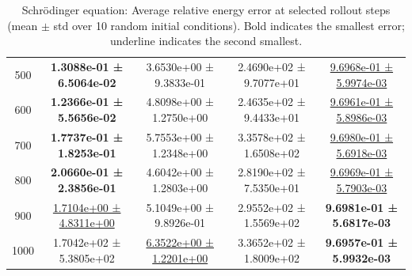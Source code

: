 \documentclass{article}
\theoremstyle{plain}
\theoremstyle{definition}
\theoremstyle{remark}
\begin{document}
\begin{table}[htbp]
\begin{tabular}{ccccc}
500 & \textbf{1.3088e-01 ± 6.5064e-02} & 3.6530e+00 ± 9.3833e-01 & 2.4690e+02 ± 9.7077e+01 & \underline{9.6968e-01 ± 5.9974e-03} \\
600 & \textbf{1.2366e-01 ± 5.5656e-02} & 4.8098e+00 ± 1.2750e+00 & 2.4635e+02 ± 9.4433e+01 & \underline{9.6961e-01 ± 5.8986e-03} \\
700 & \textbf{1.7737e-01 ± 1.8253e-01} & 5.7553e+00 ± 1.2348e+00 & 3.3578e+02 ± 1.6508e+02 & \underline{9.6980e-01 ± 5.6918e-03} \\
800 & \textbf{2.0660e-01 ± 2.3856e-01} & 4.6042e+00 ± 1.2803e+00 & 2.8190e+02 ± 7.5350e+01 & \underline{9.6969e-01 ± 5.7903e-03} \\
900 & \underline{1.7104e+00 ± 4.8311e+00} & 5.1049e+00 ± 9.8926e-01 & 2.9552e+02 ± 1.5569e+02 & \textbf{9.6981e-01 ± 5.6817e-03} \\
1000& 1.7042e+02 ± 5.3805e+02 & \underline{6.3522e+00 ± 1.2201e+00} & 3.3652e+02 ± 1.8009e+02 & \textbf{9.6957e-01 ± 5.9932e-03} \\
\hline
\end{tabular}
\caption{Schr\"odinger equation: Average relative energy error at selected rollout steps
(mean $\pm$ std over 10 random initial conditions).
Bold indicates the smallest error; underline indicates the second smallest.}
\label{tab:sch-energy_errors_time_rows}
\end{table}
\end{document}
